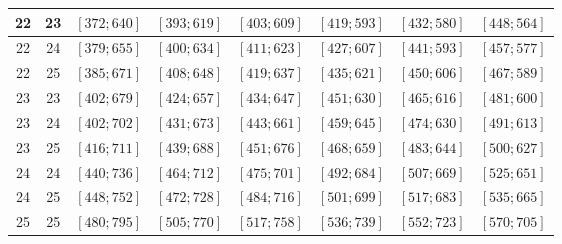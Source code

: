 \documentclass[a4paper,12pt]{article}
\begin{document}
\begin{center}
{\begin{longtable}[H]{|c|c|c|c|c|c|c|c|}
22 &  23 &  $\left[ 372; 640\right]$ &  $\left[ 393; 619\right]$ &  $\left[ 403; 609\right]$ &  $\left[ 419; 593\right]$ &  $\left[ 432; 580\right]$ &  $\left[ 448; 564\right]$ \tabularnewline \hline
22 &  24 &  $\left[ 379; 655\right]$ &  $\left[ 400; 634\right]$ &  $\left[ 411; 623\right]$ &  $\left[ 427; 607\right]$ &  $\left[ 441; 593\right]$ &  $\left[ 457; 577\right]$ \tabularnewline \hline
22 &  25 &  $\left[ 385; 671\right]$ &  $\left[ 408; 648\right]$ &  $\left[ 419; 637\right]$ &  $\left[ 435; 621\right]$ &  $\left[ 450; 606\right]$ &  $\left[ 467; 589\right]$ \tabularnewline \hline
23 &  23 &  $\left[ 402; 679\right]$ &  $\left[ 424; 657\right]$ &  $\left[ 434; 647\right]$ &  $\left[ 451; 630\right]$ &  $\left[ 465; 616\right]$ &  $\left[ 481; 600\right]$ \tabularnewline \hline
23 &  24 &  $\left[ 402; 702\right]$ &  $\left[ 431; 673\right]$ &  $\left[ 443; 661\right]$ &  $\left[ 459; 645\right]$ &  $\left[ 474; 630\right]$ &  $\left[ 491; 613\right]$ \tabularnewline \hline
23 &  25 &  $\left[ 416; 711\right]$ &  $\left[ 439; 688\right]$ &  $\left[ 451; 676\right]$ &  $\left[ 468; 659\right]$ &  $\left[ 483; 644\right]$ &  $\left[ 500; 627\right]$ \tabularnewline \hline
24 &  24 &  $\left[ 440; 736\right]$ &  $\left[ 464; 712\right]$ &  $\left[ 475; 701\right]$ &  $\left[ 492; 684\right]$ &  $\left[ 507; 669\right]$ &  $\left[ 525; 651\right]$ \tabularnewline \hline
24 &  25 &  $\left[ 448; 752\right]$ &  $\left[ 472; 728\right]$ &  $\left[ 484; 716\right]$ &  $\left[ 501; 699\right]$ &  $\left[ 517; 683\right]$ &  $\left[ 535; 665\right]$ \tabularnewline \hline
25 &  25 &  $\left[ 480; 795\right]$ &  $\left[ 505; 770\right]$ &  $\left[ 517; 758\right]$ &  $\left[ 536; 739\right]$ &  $\left[ 552; 723\right]$ &  $\left[ 570; 705\right]$ \tabularnewline \hline
\end{longtable}
}
\end{center}

{}
\newpage
\end{document}

